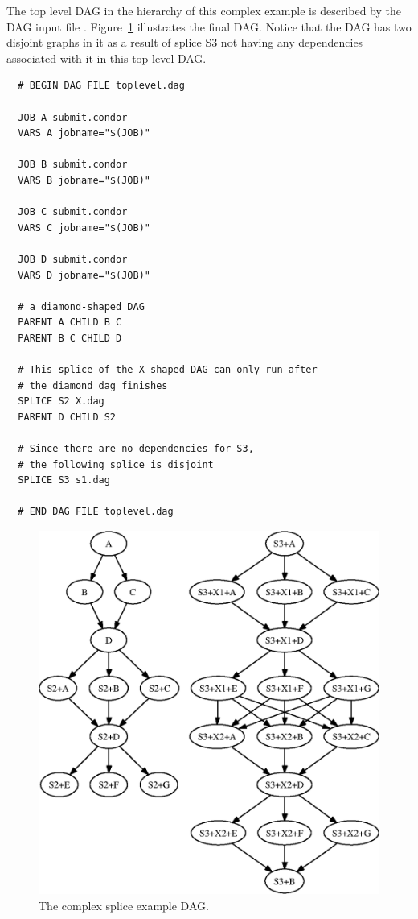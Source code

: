 The top level DAG in the hierarchy of this complex example
is described by the DAG input file .
Figure~\ref{fig:dagman-splice-complex} illustrates the final DAG.
Notice that the DAG has two disjoint graphs in it as a result of splice
S3 not having any dependencies associated with it in this top level DAG.

\begin{verbatim}
  # BEGIN DAG FILE toplevel.dag

  JOB A submit.condor
  VARS A jobname="$(JOB)"

  JOB B submit.condor
  VARS B jobname="$(JOB)"

  JOB C submit.condor
  VARS C jobname="$(JOB)"

  JOB D submit.condor
  VARS D jobname="$(JOB)"

  # a diamond-shaped DAG
  PARENT A CHILD B C
  PARENT B C CHILD D

  # This splice of the X-shaped DAG can only run after
  # the diamond dag finishes
  SPLICE S2 X.dag
  PARENT D CHILD S2

  # Since there are no dependencies for S3,
  # the following splice is disjoint 
  SPLICE S3 s1.dag

  # END DAG FILE toplevel.dag
\end{verbatim}


\begin{figure}
\centering
\includegraphics{user-man/splice-complex.eps}
\caption{\label{fig:dagman-splice-complex} The complex splice example DAG.}
\end{figure}


